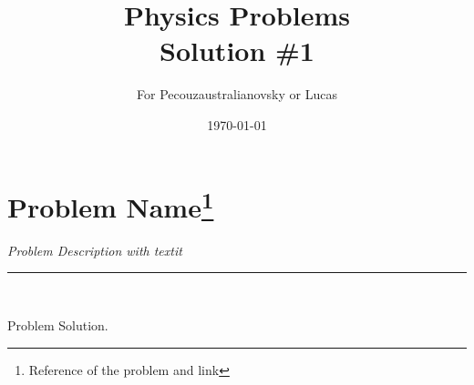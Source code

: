 \documentclass{article}
\begin{document}
\title{Physics Problems\\ Solution \#1} %

\author{For Pecouzaustralianovsky or Lucas} %

\date{\today}
\maketitle

\section*{Problem Name\footnote{Reference of the problem and link}}

\textit{Problem Description with textit}

\begin{center}
\noindent\rule{3cm}{0.4pt}\\
\end{center}

\vspace{2mm}

Problem Solution.\\
\end{document}
